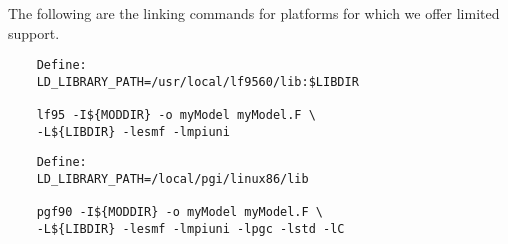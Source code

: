 \noindent The following are the linking commands for platforms for which
we offer limited support.


\begin{verbatim}
    Define:
    LD_LIBRARY_PATH=/usr/local/lf9560/lib:$LIBDIR

    lf95 -I${MODDIR} -o myModel myModel.F \
    -L${LIBDIR} -lesmf -lmpiuni

\end{verbatim}

   


\begin{verbatim}
    Define:
    LD_LIBRARY_PATH=/local/pgi/linux86/lib

    pgf90 -I${MODDIR} -o myModel myModel.F \
    -L${LIBDIR} -lesmf -lmpiuni -lpgc -lstd -lC

\end{verbatim}








